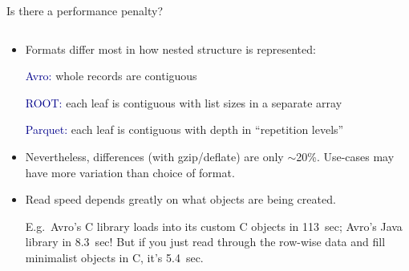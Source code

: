 \documentclass{beamer}
\begin{document}
\begin{frame}{Is there a performance penalty?}
\vspace{0.35 cm}
\begin{columns}
\begin{column}{0.55\linewidth}
\begin{itemize}
\item<1-> Formats differ most in how nested structure is represented:
\small

\vspace{0.1 cm}
\textcolor{darkblue}{Avro:} whole records are contiguous

\textcolor{darkblue}{ROOT:} each leaf is contiguous with list sizes in a separate array

\textcolor{darkblue}{Parquet:} each leaf is contiguous with depth in ``repetition levels''

\normalsize
\item<2-> Nevertheless, differences (with gzip/deflate) are only $\sim$20\%. Use-cases may have more variation than choice of format.

\item<3-> Read speed depends greatly on what objects are being created.

\scriptsize
\vspace{0.1 cm}
E.g.\ Avro's C library loads into its custom C objects in 113~sec; Avro's Java library in 8.3~sec! But if you just read through the row-wise data and fill minimalist objects in C, it's 5.4~sec.


\end{itemize}
\end{column}
\end{columns}
\end{frame}
\end{document}
